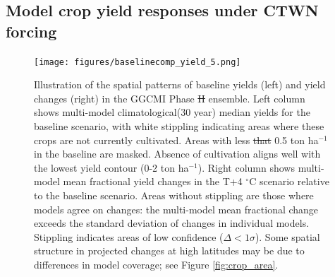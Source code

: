 \documentclass[gmd, manuscript]{copernicus} %
\providecommand{\DIFadd}[1]{{\protect\color{blue}\uwave{#1}}} %
\providecommand{\DIFdel}[1]{{\protect\color{red}\sout{#1}}}                      %
\providecommand{\DIFaddFL}[1]{\DIFadd{#1}} %
\providecommand{\DIFdelFL}[1]{\DIFdel{#1}} %
\providecommand{\DIFaddbeginFL}{} %
\providecommand{\DIFaddendFL}{} %
\providecommand{\DIFdelbeginFL}{} %
\providecommand{\DIFdelendFL}{} %
\begin{document}
\subsection{Model crop yield responses under CTWN forcing}
\begin{figure}[ht]
\centering
  \texttt{[image: figures/baselinecomp\_yield\_5.png]} 
  \caption{
  Illustration of the spatial patterns of baseline yields (left) and yield changes (right) in the GGCMI Phase \DIFdelbeginFL \DIFdelFL{II }\DIFdelendFL \DIFaddbeginFL \DIFaddFL{2 }\DIFaddendFL ensemble. 
  Left column shows multi-model climatological(30 year) median yields for the baseline scenario, with white stippling indicating areas where these crops are not currently cultivated. 
  Areas with less \DIFdelbeginFL \DIFdelFL{that }\DIFdelendFL \DIFaddbeginFL \DIFaddFL{than }\DIFaddendFL 0.5 ton ha$^{-1}$ in the baseline are masked.
  Absence of cultivation aligns well with the lowest yield contour (0-2 ton ha$^{-1}$). 
  Right column shows multi-model mean fractional yield changes in the T+4 $^{\circ}$C scenario relative to the baseline scenario. 
  Areas without stippling are those where models agree on changes: the multi-model mean fractional change exceeds the standard deviation of changes in individual models. 
  Stippling indicates areas of low confidence ($\Delta < 1 \sigma$). 
  Some spatial structure in projected changes at high latitudes may be due to differences in model coverage; see Figure \ref{fig:crop_area}.
  }
  \label{fig:maizesoybaseline}
\end{figure}
\end{document}
